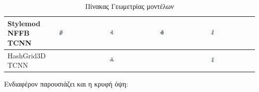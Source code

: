 \begin{table}[H]
\begin{tabularx}{\textwidth}{|p{3.2cm}|X|X|X|X|}
\hline
Stylemod NFFB TCNN & \includegraphics[width=0.2\textwidth]{images/chapter5_img/MeshReconResults/TinyCudaNN-StylemodNFFB/65_2000.jpg} & \includegraphics[width=0.2\textwidth]{images/chapter5_img/MeshReconResults/TinyCudaNN-StylemodNFFB/110_bad.jpg} & \includegraphics[width=0.2\textwidth]{images/chapter5_img/MeshReconResults/TinyCudaNN-StylemodNFFB/114_2000.jpg} & \includegraphics[width=0.2\textwidth]{images/chapter5_img/MeshReconResults/TinyCudaNN-StylemodNFFB/122.jpg} \\
\hline
HashGrid3D TCNN & & \includegraphics[width=0.2\textwidth]{images/chapter5_img/MeshReconResults/TinyCUDANN-MRHashGrid3D/110.jpg} & & \includegraphics[width=0.2\textwidth]{images/chapter5_img/MeshReconResults/TinyCUDANN-MRHashGrid3D/122.jpg} \\
\hline
\end{tabularx}
\caption{Πίνακας Γεωμετρίας  μοντέλων}
\end{table}
\clearpage
Ενδιαφέρον παρουσιάζει και η κρυφή όψη:
